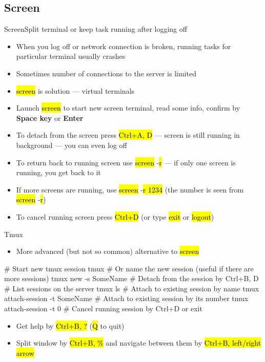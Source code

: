 \documentclass[compress, ucs, xelatex, 11pt, xcolor=svgnames, aspectratio=169,
	hyperref={
		bookmarks=true,
		unicode=true,
		colorlinks=true,
		pdftitle={Linux, command line and MetaCentrum},
		plainpages=false,
		pdfauthor={Vojtech Zeisek},
		pdfsubject={Course about use of Linux command line, writing shell scripts and using MetaCentrum of CESNET},
		pdfcreator={XeLaTeX},
		pdfkeywords={Linux, GNU, BASH, shell, command line, MetaCentrum},
		linkcolor=DarkRed, %
		anchorcolor=DarkBlue, %
		citecolor=Indigo, %
		filecolor=NavyBlue, %
		menucolor=DarkMagenta, %
		urlcolor=DarkBlue, %
		pdftex},
	url={hyphens, lowtilde} %
	]{beamer}
\renewcommand{\texttt}[1]{\hl{\ttfamily #1}}
\begin{document}
\subsection{Screen}

\begin{frame}{Screen}{Split terminal or keep task running after logging off}
	\begin{itemize}
		\item When you log off or network connection is broken, running tasks for particular terminal usually crashes
		\item Sometimes number of connections to the server is limited
		\item \texttt{screen} is solution --- virtual terminals
		\item Launch \texttt{screen} to start new screen terminal, read some info, confirm by \textbf{Space key} or \textbf{Enter}
		\item To detach from the screen press \texttt{Ctrl+A, D} --- screen is still running in background --- you can even log off
		\item To return back to running screen use \texttt{screen} -\texttt{r} --- if only one screen is running, you get back to it
		\item If more screens are running, use \texttt{screen} -\texttt{r 1234} (the number is seen from \texttt{screen} -\texttt{r})
		\item To cancel running screen press \texttt{Ctrl+D} (or type \texttt{exit} or \texttt{logout})
	\end{itemize}
\end{frame}

\begin{frame}[fragile]{Tmux}
	\begin{itemize}
		\item More advanced (but not so common) alternative to \texttt{screen}
	\end{itemize}
	\vfill
	\begin{bashcode}
    # Start new tmux session
    tmux
    # Or name the new session (useful if there are more sessions)
    tmux new -s SomeName
    # Detach from the session by Ctrl+B, D
    # List sessions on the server
    tmux ls
    # Attach to existing session by name
    tmux attach-session -t SomeName
    # Attach to existing session by its number
    tmux attach-session -t 0
    # Cancel running session by Ctrl+D or exit
	\end{bashcode}
	\vfill
	\begin{itemize}
		\item Get help by \texttt{Ctrl+B, ?} (\texttt{Q} to quit)
		\item Split window by \texttt{Ctrl+B, \%} and navigate between them by \texttt{Ctrl+B, left/right arrow}
	\end{itemize}
\end{frame}
\end{document}
